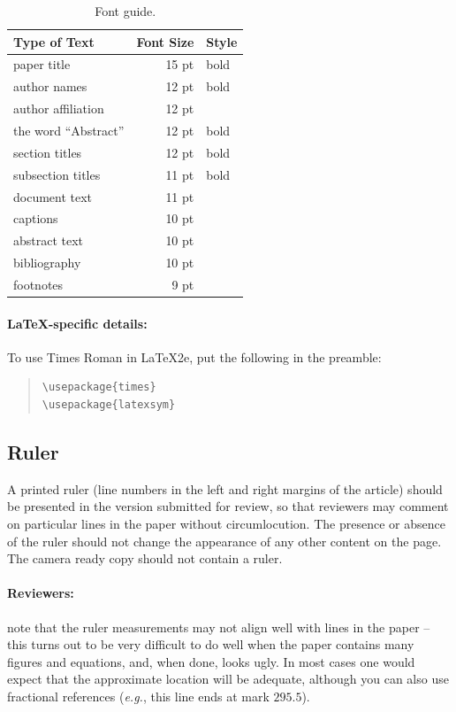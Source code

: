 \documentclass[11pt,a4paper]{article}
\begin{document}
\begin{table}
\centering
\begin{tabular}{lrl}
\hline \textbf{Type of Text} & \textbf{Font Size} & \textbf{Style} \\ \hline
paper title & 15 pt & bold \\
author names & 12 pt & bold \\
author affiliation & 12 pt & \\
the word ``Abstract'' & 12 pt & bold \\
section titles & 12 pt & bold \\
subsection titles & 11 pt & bold \\
document text & 11 pt  &\\
captions & 10 pt & \\
abstract text & 10 pt & \\
bibliography & 10 pt & \\
footnotes & 9 pt & \\
\hline
\end{tabular}
\caption{\label{font-table} Font guide. }
\end{table}

\paragraph{\LaTeX-specific details:}
To use Times Roman in \LaTeX2e{}, put the following in the preamble:
\begin{quote}
\small
\begin{verbatim}
\usepackage{times}
\usepackage{latexsym}
\end{verbatim}
\end{quote}


\subsection{Ruler}
A printed ruler (line numbers in the left and right margins of the article) should be presented in the version submitted for review, so that reviewers may comment on particular lines in the paper without circumlocution.
The presence or absence of the ruler should not change the appearance of any other content on the page.
The camera ready copy should not contain a ruler.

\paragraph{Reviewers:}
note that the ruler measurements may not align well with lines in the paper -- this turns out to be very difficult to do well when the paper contains many figures and equations, and, when done, looks ugly.
In most cases one would expect that the approximate location will be adequate, although you can also use fractional references (\emph{e.g.}, this line ends at mark $295.5$).
\end{document}
